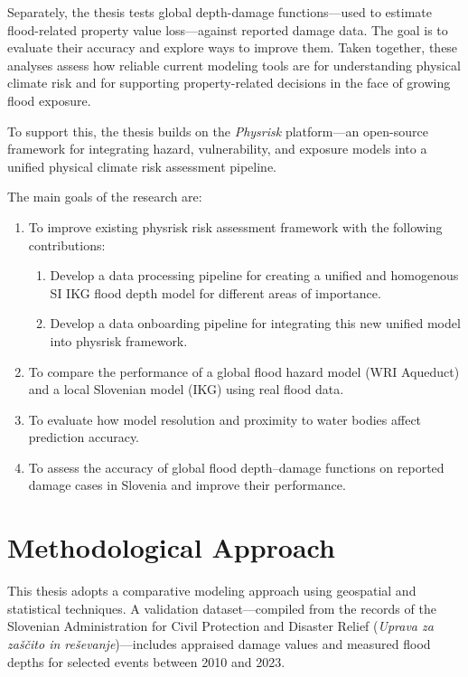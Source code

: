 Separately, the thesis tests global depth-damage functions—used to estimate flood-related property value loss—against reported damage data. The goal is to evaluate their accuracy and explore ways to improve them. Taken together, these analyses assess how reliable current modeling tools are for understanding physical climate risk and for supporting property-related decisions in the face of growing flood exposure.

To support this, the thesis builds on the \textit{Physrisk} platform—an open-source framework for integrating hazard, vulnerability, and exposure models into a unified physical climate risk assessment pipeline.

The main goals of the research are:
\begin{enumerate}
    \item {To improve existing physrisk risk assessment framework with the following contributions:}
    \begin{enumerate}
        \item {Develop a data processing pipeline for creating a unified and homogenous SI IKG flood depth model for different areas of importance.}
        \item {Develop a data onboarding pipeline for integrating this new unified model into physrisk framework.}
    \end{enumerate}
    \item {To compare the performance of a global flood hazard model (WRI Aqueduct) and a local Slovenian model (IKG) using real flood data.}
    \item {To evaluate how model resolution and proximity to water bodies affect prediction accuracy.}
    \item {To assess the accuracy of global flood depth–damage functions on reported damage cases in Slovenia and improve their performance.}

\end{enumerate}

\section{Methodological Approach}

This thesis adopts a comparative modeling approach using geospatial and statistical techniques. A validation dataset—compiled from the records of the Slovenian Administration for Civil Protection and Disaster Relief (\textit{Uprava za zaščito in reševanje})—includes appraised damage values and measured flood depths for selected events between 2010 and 2023.

